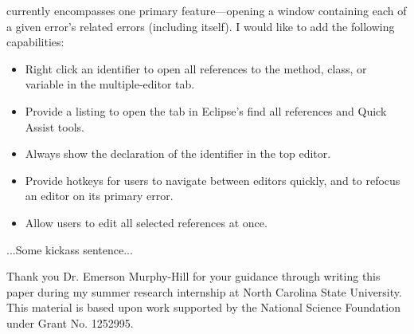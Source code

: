 \documentclass{sigplanconf}
\begin{document}
\pname{} currently encompasses one primary
feature---opening a window containing each of a given error's related errors
(including itself). I would like to add the following capabilities:

\begin{itemize}
  \item Right click an identifier to open all references to the method, class,
      or variable in the multiple-editor tab.
  \item Provide a listing to open the tab in Eclipse's find all references and
      Quick Assist tools.
  \item Always show the declaration of the identifier in the top editor.
  \item Provide hotkeys for users to navigate between editors quickly, and to
      refocus an editor on its primary error.
  \item Allow users to edit all selected references at once.
\end{itemize}

...Some kickass sentence...  

\appendix
% 

\acks
Thank you Dr. Emerson Murphy-Hill for your guidance through writing this
paper during my summer research internship at North Carolina State University.
This material is based upon work supported by the National Science Foundation
under Grant No. 1252995.





\softraggedright

\end{document}
